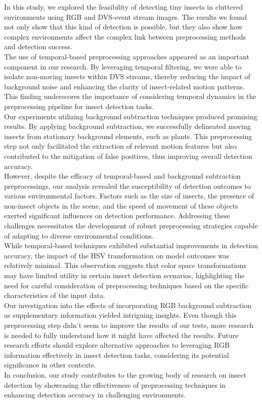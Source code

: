 \documentclass[sigchi,screen]{acmart}
\begin{document}
In this study, we explored the feasibility of detecting tiny insects in cluttered environments using RGB and DVS-event stream images. The results we found not only show that this kind of detection is possible, but they also show how complex environments affect the complex link between preprocessing methods and detection success.\\
The use of temporal-based preprocessing approaches appeared as an important component in our research. By leveraging temporal filtering, we were able to isolate non-moving insects within DVS streams, thereby reducing the impact of background noise and enhancing the clarity of insect-related motion patterns. This finding underscores the importance of considering temporal dynamics in the preprocessing pipeline for insect detection tasks.\\
Our experiments utilizing background subtraction techniques produced promising results. By applying background subtraction, we successfully delineated moving insects from stationary background elements, such as plants. This preprocessing step not only facilitated the extraction of relevant motion features but also contributed to the mitigation of false positives, thus improving overall detection accuracy.\\
However, despite the efficacy of temporal-based and background subtraction preprocessings, our analysis revealed the susceptibility of detection outcomes to various environmental factors. Factors such as the size of insects, the presence of non-insect objects in the scene, and the speed of movement of these objects exerted significant influences on detection performance. Addressing these challenges necessitates the development of robust preprocessing strategies capable of adapting to diverse environmental conditions.\\
While temporal-based techniques exhibited substantial improvements in detection accuracy, the impact of the HSV transformation on model outcomes was relatively minimal. This observation suggests that color space transformations may have limited utility in certain insect detection scenarios, highlighting the need for careful consideration of preprocessing techniques based on the specific characteristics of the input data.\\
Our investigation into the effects of incorporating RGB background subtraction as supplementary information yielded intriguing insights. Even though this preprocessing step didn't seem to improve the results of our tests, more research is needed to fully understand how it might have affected the results. Future research efforts should explore alternative approaches to leveraging RGB information effectively in insect detection tasks, considering its potential significance in other contexts.\\
In conclusion, our study contributes to the growing body of research on insect detection by showcasing the effectiveness of preprocessing techniques in enhancing detection accuracy in challenging environments.
\end{document}
